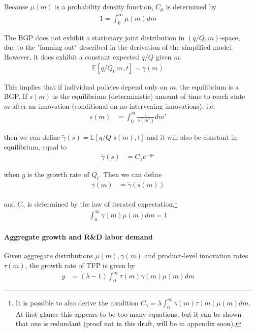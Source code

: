 \documentclass[12pt,english]{article}
\theoremstyle{remark}
\begin{document}
Because $\mu(m)$ is a probability density function, $C_\mu$ is determined by
\begin{align}
	1 = \int_0^{\infty} \mu(m) dm \label{KF_solution_2}
\end{align}

The BGP does not exhibit a stationary joint distribution in $(q/Q,m)$-space, due to the "fanning out" described in the derivation of the simplified model. However, it does exhibit a constant expected $q/Q$ given $m$:
\begin{align}
	\mathbb{E}[q/Q_t|m,t] = \gamma(m)
\end{align}

This implies that if individual policies depend only on $m$, the equilibrium is a BGP. If $s(m)$ is the equilibrium (deterministic) amount of time to reach state $m$ after an innovation (conditional on no intervening innovations), i.e.
\begin{align}
	s(m) &= \int_0^m \frac{1}{a(m')} dm'
\end{align}

then we can define $\tilde{\gamma}(s) = \mathbb{E}[q/Q|s(m),t]$ and it will also be constant in equilibrium, equal to
\begin{align}
	\tilde{\gamma}(s) &= C_{\gamma} e^{-gs}
\end{align}

when $g$ is the growth rate of $Q_t$. Then we can define
\begin{align}
	\gamma(m) &= \tilde{\gamma}(s(m))
\end{align}

and $C_{\gamma}$ is determined by the law of iterated expectation,\footnote{It is possible to also derive the condition $C_{\gamma} = \lambda \int_0^{\infty} \gamma(m) \tau(m) \mu(m) dm$. At first glance this appears to be too many equations, but it can be shown that one is redundant (proof not in this draft, will be in appendix soon).}
\begin{align}
	\int_0^{\infty} \gamma(m) \mu(m) dm = 1
\end{align}

\paragraph{Aggregate growth and R\&D labor demand}

Given aggregate distributions $\mu(m),\gamma(m)$ and product-level innovation rates $\tau(m)$, the growth rate of TFP is given by
\begin{align}
	g &= (\lambda -1) \int_0^{\infty} \tau(m) \gamma(m) \mu(m) dm 
\end{align}
\end{document}
